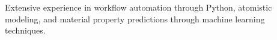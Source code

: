 \vspace*{1px}
Extensive experience in workflow automation through Python, atomistic modeling, and material property predictions through machine learning techniques.
